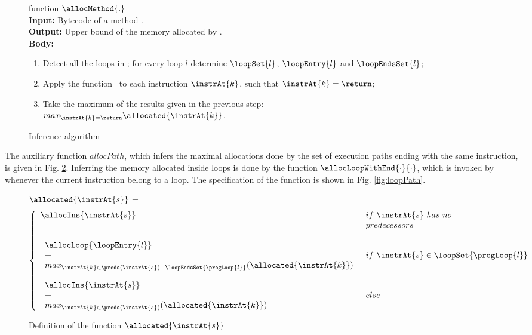 \begin{figure}[!htp]
\begin{frameit}
function $\allocMethod{.}$\\
\textbf{Input:} Bytecode of a method \methodd{} . \\
\textbf{Output:} Upper bound of the memory allocated by \methodd{} . \\
\textbf{Body:}
\begin{enumerate}
   \item Detect all the loops in \methodd{}; for every loop $l$ determine $\loopSet{l}$, $\loopEntry{l}$ and $\loopEndsSet{l}$;
   \item Apply the function \allocatedOnly \  to each instruction $\instrAt{k}$, such that $\instrAt{k} = \return$;
   \item Take the maximum of the results given in the previous step: \\
 $max_{\instrAt{k} = \return } \allocated{\instrAt{k}}$.
\end{enumerate}
\caption{\sc Inference algorithm}
\label{methodAlloc}
\end{frameit}
\end{figure}
The auxiliary function $allocPath$, which infers the maximal allocations done by the set of execution paths ending with the same \return{} instruction,
 is given in Fig. \ref{fig:allocMethod}.
Inferring the memory allocated inside loops is done by the function $\allocLoopWithEnd{\cdot}{\cdot}$, which is invoked by \allocatedOnly{} whenever the 
current instruction belong to a loop. The specification of the function is shown in Fig. \ref{fig:loopPath}.

\begin{figure}[!hbp]
\begin{frameit}
$\allocated{\instrAt{s}}$ = 
$$ \left\{ \begin{array}{ll}
\allocIns{\instrAt{s} }   & if \ \instrAt{s} \ has \ no \\ 
                          &  predecessors \\
& \\
  \begin{array}{l}
            \allocLoop{\loopEntry{l}} \\
             + \\
            max_{\instrAt{k} \in \preds(\instrAt{s} )-\loopEndsSet{\progLoop{l}}}( \allocated{\instrAt{k}} ) \\
                   \end{array}      & if   \  \instrAt{s} \in \loopSet{\progLoop{l}} \\
& \\
\begin{array}{l}
\allocIns{\instrAt{s}} \\
 + \\
max_{\instrAt{k} \in \preds(\instrAt{s} )}
 ( \allocated{\instrAt{k}} )
                       \end{array} & else 
\end{array} 
\right.
$$
\caption{\sc Definition of the function $\allocated{\instrAt{s}}$} 
\label{fig:allocMethod}
\end{frameit}
\end{figure}


